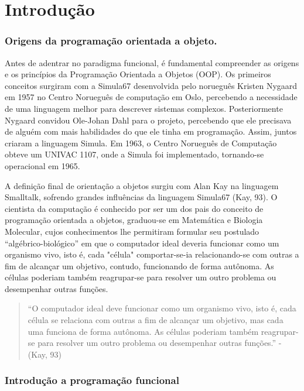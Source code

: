 \chapter{Introdução}

\subsection{Origens da programação orientada a objeto.}

Antes de adentrar no paradigma funcional, é fundamental compreender as origens e os princípios da Programação Orientada a Objetos (OOP). Os primeiros conceitos surgiram com a Simula67 desenvolvida pelo norueguês Kristen Nygaard em 1957 no Centro Norueguês de computação em Oslo, percebendo a necessidade de uma linguagem melhor para descrever sistemas complexos. Posteriormente Nygaard convidou Ole-Johan Dahl para o projeto, percebendo que ele precisava de alguém com mais habilidades do que ele tinha em programação. Assim, juntos criaram a linguagem Simula. Em 1963, o Centro Norueguês de Computação obteve um UNIVAC 1107, onde a Simula foi implementado, tornando-se operacional em 1965.  


A definição final de orientação a objetos surgiu com Alan Kay na linguagem Smalltalk, sofrendo grandes influências da linguagem Simula67 
 (Kay, 93). O cientista da computação é conhecido por ser um dos pais do conceito de programação orientada a objetos, graduou-se em Matemática e Biologia Molecular, cujos conhecimentos lhe permitiram formular seu postulado “algébrico-biológico” em que o computador ideal deveria funcionar como um organismo vivo, isto é, cada "célula" comportar-se-ia relacionando-se com outras a fim de alcançar um objetivo, contudo, funcionando de forma autônoma. As células poderiam também reagrupar-se para resolver um outro problema ou desempenhar outras funções.

\begin{quote}
“O computador ideal deve funcionar como um organismo vivo, isto é, cada célula se relaciona com outras a fim de alcançar um objetivo, mas cada uma funciona de forma autônoma. As células poderiam também reagrupar-se para resolver um outro problema ou desempenhar outras funções.” - (Kay, 93)
\end{quote}

\subsection{Introdução a programação funcional}

